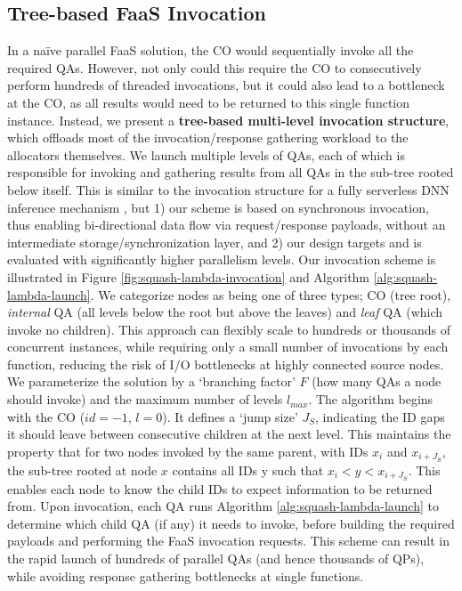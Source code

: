 \subsection{Tree-based FaaS Invocation}



\label{sss:4-tree-launch}
In a naïve parallel FaaS solution, the CO would sequentially invoke all the required QAs. 
However, not only could this require the CO to consecutively perform hundreds of threaded invocations, but it could also lead to a bottleneck at the CO, as all results would need to be returned to this single function instance. 
Instead, we present a \textbf{tree-based multi-level invocation structure}, which offloads most of the invocation/response gathering workload to the allocators themselves. 
We launch multiple levels of QAs, each of which is responsible for invoking and gathering results from all QAs in the sub-tree rooted below itself. 
This is similar to the invocation structure for a fully serverless DNN inference mechanism \cite{Oakley2024FSDInference}, but 1) our scheme is based on synchronous invocation, thus enabling bi-directional data flow via request/response payloads, without an intermediate storage/synchronization layer, and 2) our design targets and is evaluated with significantly higher parallelism levels. 
Our invocation scheme is illustrated in Figure \ref{fig:squash-lambda-invocation} and Algorithm \ref{alg:squash-lambda-launch}. 
We categorize nodes as being one of three types; CO (tree root), \textit{internal} QA (all levels below the root but above the leaves) and \textit{leaf} QA (which invoke no children). 
This approach can flexibly scale to hundreds or thousands of concurrent instances, while requiring only a small number of invocations by each function, reducing the risk of I/O bottlenecks at highly connected source nodes.
We parameterize the solution by a `branching factor' $F$ (how many QAs a node should invoke) and the maximum number of levels $l_{max}$. 
The algorithm begins with the CO ($id = -1$, $l = 0$). It defines a `jump size' $J_S$, indicating the ID gaps it should leave between consecutive children at the next level. 
This maintains the property that for two nodes invoked by the same parent, with IDs $x_i$ and $x_{i+J_S}$, the sub-tree rooted at node $x$ contains all IDs y such that $x_i < y < x_{i+J_S}$. 
This enables each node to know the child IDs to expect information to be returned from.
Upon invocation, each QA runs Algorithm \ref{alg:squash-lambda-launch} to determine which child QA (if any) it needs to invoke, before building the required payloads and performing the FaaS invocation requests. This scheme can result in the rapid launch of hundreds of parallel QAs (and hence thousands of QPs), while avoiding response gathering bottlenecks at single functions. 

